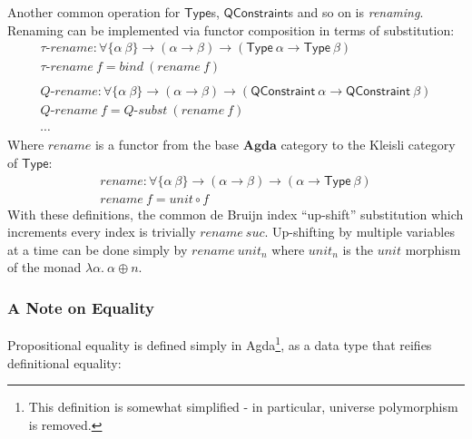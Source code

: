 \documentclass[a4paper]{jfp}
\begin{document}
Another common operation for $\textsf{Type}$s, $\textsf{QConstraint}$s and so on is \emph{renaming}. Renaming can be implemented via functor
composition in terms of substitution:
\begin{displaymath}
   \begin{array}{l}
      \textit{$\tau$-rename} : \forall \{ \alpha\ \beta \} \rightarrow (\alpha \rightarrow \beta) \rightarrow (\textsf{Type}\ \alpha \rightarrow \textsf{Type}\ \beta) \\
      \textit{$\tau$-rename}\ f = \mathit{bind}\ (\mathit{rename}\ f) \\ \\ 
      \textit{Q-rename} :  \forall \{ \alpha\ \beta \} \rightarrow(\alpha \rightarrow \beta) \rightarrow (\textsf{QConstraint}\ \alpha \rightarrow \textsf{QConstraint}\ \beta) \\
      \textit{Q-rename}\ f = \textit{Q-subst}\ (\mathit{rename}\ f) \\  \\ 
      \cdots
   \end{array}
\end{displaymath}
Where $\mathit{rename}$ is a functor from the base $\textbf{Agda}$ category to the Kleisli category of $\textsf{Type}$:
\begin{displaymath}
   \begin{array}{l}
      \textit{rename} : \forall \{ \alpha\ \beta \} \rightarrow (\alpha \rightarrow \beta) \rightarrow (\alpha \rightarrow \textsf{Type}\ \beta) \\
      \textit{rename}\ f = \mathit{unit} \circ f
   \end{array}
\end{displaymath}
\nopagebreak
With these definitions, the common de Bruijn index ``up-shift'' substitution which increments every index is trivially $\mathit{rename}\
\mathit{suc}$. Up-shifting by multiple variables at a time can be done simply by $\mathit{rename}\ \mathit{unit}_n$ where $\mathit{unit}_n$ is the
$\mathit{unit}$ morphism of the monad $\lambda \alpha.\ \alpha \oplus n$. 

\subsubsection{A Note on Equality}

Propositional equality is defined simply in Agda\footnote{This definition is somewhat simplified - in particular, universe polymorphism is removed.},
as a data type that reifies definitional equality:
\end{document}
